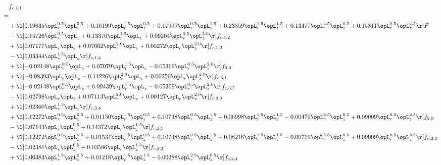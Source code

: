 \begin{alignat}{2} 
\label{eq:f_11_2} 
& f_{c,1,1} \nonumber \\ 
 = \\ 
& + \l[  0.19635 \opL_r^{0.5} \opL_z^{0.5} +  0.16199 \opL_r^{1.5} \opL_z^{0.5} +  0.17999 \opL_r^{0.5} \opL_z^{1.5} +  0.23859 \opL_r^{1.5} \opL_z^{1.5} +  0.13477 \opL_r^{2.5} \opL_z^{0.5} +  0.15811 \opL_r^{0.5} \opL_z^{2.5}  \r] F \nonumber \\ 
& - \l[  0.14726 \opL_r^{0.5} \opL_z +  0.13376 \opL_r^{1.5} \opL_z +  0.09204 \opL_r^{0.5} \opL_z^{2.0}  \r] f_{c,1,2} \nonumber \\ 
& + \l[  0.07177 \opL_r \opL_z +  0.07662 \opL_r^{2.0} \opL_z +  0.05272 \opL_r \opL_z^{2.0}  \r] f_{c,1,3} \nonumber \\ 
& - \l[  0.03344 \opL_r^{1.5} \opL_z  \r] f_{c,1,4} \nonumber \\ 
& + \l[  -0.02148 \opL_r^{0.5} \opL_z +  0.07079 \opL_r^{1.5} \opL_z   -0.05369 \opL_r^{0.5} \opL_z^{2.0}  \r] f_{3,0} \nonumber \\ 
& + \l[  -0.08393 \opL_r \opL_z   -0.14226 \opL_r^{2.0} \opL_z +  0.00250 \opL_r \opL_z^{2.0}  \r] f_{c,3,1} \nonumber \\ 
& + \l[  -0.02148 \opL_r^{0.5} \opL_z +  0.09439 \opL_r^{1.5} \opL_z   -0.05369 \opL_r^{0.5} \opL_z^{2.0}  \r] f_{c,3,2} \nonumber \\ 
& - \l[  0.02798 \opL_r \opL_z +  0.07113 \opL_r^{2.0} \opL_z +  0.00127 \opL_r \opL_z^{2.0}  \r] f_{c,3,3} \nonumber \\ 
& + \l[  0.02360 \opL_r^{1.5} \opL_z  \r] f_{c,3,4} \nonumber \\ 
& + \l[  0.12272 \opL_r^{0.5} \opL_z^{0.5} +  0.01150 \opL_r^{1.5} \opL_z^{0.5} +  0.10738 \opL_r^{0.5} \opL_z^{1.5} +  0.06998 \opL_r^{1.5} \opL_z^{1.5}   -0.00479 \opL_r^{2.5} \opL_z^{0.5} +  0.09009 \opL_r^{0.5} \opL_z^{2.5}  \r] f_{2,0} \nonumber \\ 
& - \l[  0.07143 \opL_r \opL_z^{0.5} +  0.14372 \opL_r \opL_z^{1.5}  \r] f_{c,2,1} \nonumber \\ 
& + \l[  0.12272 \opL_r^{0.5} \opL_z^{0.5} +  0.01534 \opL_r^{1.5} \opL_z^{0.5} +  0.10738 \opL_r^{0.5} \opL_z^{1.5} +  0.08216 \opL_r^{1.5} \opL_z^{1.5}   -0.00719 \opL_r^{2.5} \opL_z^{0.5} +  0.09009 \opL_r^{0.5} \opL_z^{2.5}  \r] f_{c,2,2} \nonumber \\ 
& - \l[  0.02381 \opL_r \opL_z^{0.5} +  0.03586 \opL_r \opL_z^{1.5}  \r] f_{c,2,3} \nonumber \\ 
& + \l[  0.00383 \opL_r^{1.5} \opL_z^{0.5} +  0.01218 \opL_r^{1.5} \opL_z^{1.5}   -0.00288 \opL_r^{2.5} \opL_z^{0.5}  \r] f_{c,2,4} \nonumber \\ 

\end{alignat}
